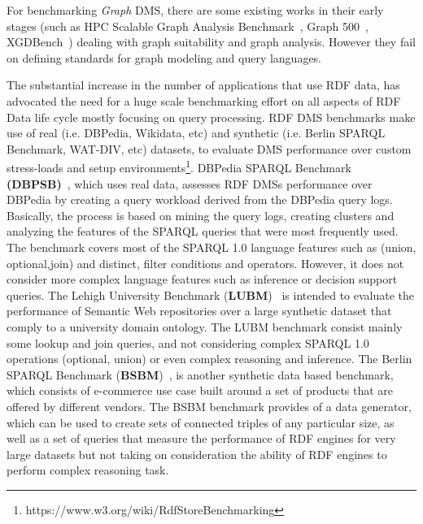 \documentclass{llncs}
\begin{document}
    For benchmarking \textit{Graph} DMS, there are some existing works in their early stages (such as HPC Scalable Graph Analysis Benchmark~\cite{Dominguez-Sal:2010:SGD:1927585.1927590}, Graph 500~\cite{murphy2010introducing}, XGDBench~\cite{conf/cloudcom/DayarathnaS12}) dealing with graph suitability and graph analysis. However they fail on defining standards for graph modeling and query languages.
    
    The substantial increase in the number of applications that use RDF data, has advocated the need for a huge scale benchmarking effort on all aspects of RDF Data life cycle mostly focusing on query processing\cite{ngomo2016hobbit}.
    RDF DMS benchmarks make use of real (i.e. DBPedia, Wikidata, etc) and synthetic (i.e. Berlin SPARQL Benchmark, WAT-DIV, etc) datasets, to evaluate DMS performance over custom stress-loads and setup environments\footnote{https://www.w3.org/wiki/RdfStoreBenchmarking}.
    DBPedia SPARQL Benchmark \textbf{(DBPSB)}~\cite{Morsey2011}, which uses real data, assesses RDF DMSs performance over DBPedia by creating a query workload derived from the DBPedia query logs. Basically, the process is based on mining the query logs, creating clusters and analyzing the features of the SPARQL queries that were most frequently used. The benchmark covers most of the SPARQL 1.0 language features such as (union, optional,join) and distinct, filter conditions and operators. However, it does not consider more complex language features such as inference or decision support queries.
    The Lehigh University Benchmark (\textbf{LUBM})~\cite{Guo:2005:LBO:1741305.1741322} is intended to evaluate the performance of Semantic Web repositories over a large synthetic dataset that comply to a university domain ontology.
    The LUBM benchmark consist mainly some lookup and join queries, and not considering complex SPARQL 1.0 operations (optional, union) or even complex reasoning and inference.
    The Berlin SPARQL Benchmark (\textbf{BSBM})~\cite{Bizer2009TheBS}, is another synthetic data based benchmark, which consists of e-commerce use case built around a set of products that are offered by different vendors.
    The BSBM benchmark provides of a data generator, which can be used to create sets of connected triples of any particular size, as well as a set of queries that measure the performance of RDF engines for very large datasets but not taking on consideration the ability of RDF engines to perform complex reasoning task.
\end{document}

